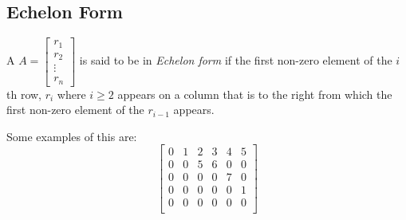 \subsection{Echelon Form}\label{subsec:Echelon_Form}
\begin{theorem}\label{thm:Echelon_Form}
  A  $A =
  \begin{bmatrix}
    r_{1} \\
    r_{2} \\
    \vdots \\
    r_{n}
  \end{bmatrix}
  $ is said to be in \emph{Echelon form} if the first non-zero element of the $i$th row, $r_{i}$ where $i \geq 2$ appears on a column that is to the right from which the first non-zero element of the $r_{i-1}$ appears.

  Some examples of this are:
  \begin{equation*}
    \begin{bmatrix}
      0 & 1 & 2 & 3 & 4 & 5 \\
      0 & 0 & 5 & 6 & 0 & 0 \\
      0 & 0 & 0 & 0 & 7 & 0 \\
      0 & 0 & 0 & 0 & 0 & 1 \\
      0 & 0 & 0 & 0 & 0 & 0 \\
    \end{bmatrix}
  \end{equation*}
\end{theorem}



